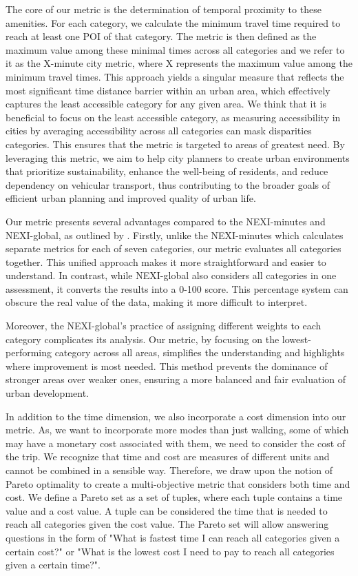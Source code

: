 The core of our metric is the determination of temporal proximity to these amenities. 
For each category, we calculate the minimum travel time required to reach at least one POI of that category. 
The metric is then defined as the maximum value among these minimal times across all categories and we refer to it as the X-minute city metric, where X represents the maximum value among the minimum travel times.
This approach yields a singular measure that reflects the most significant time distance barrier within an urban area, which effectively captures the least accessible category for any given area.
We think that it is beneficial to focus on the least accessible category, as measuring accessibility in cities by averaging accessibility across all categories can mask disparities categories. 
This ensures that the metric is targeted to areas of greatest need. 
By leveraging this metric, we aim to help city planners to create urban environments that prioritize sustainability, enhance the well-being of residents, and reduce dependency on vehicular transport, thus contributing to the broader goals of efficient urban planning and improved quality of urban life.

Our metric presents several advantages compared to the NEXI-minutes and NEXI-global, as outlined by .
Firstly, unlike the NEXI-minutes which calculates separate metrics for each of seven categories, our metric evaluates all categories together. 
This unified approach makes it more straightforward and easier to understand. 
In contrast, while NEXI-global also considers all categories in one assessment, it converts the results into a 0-100 score. 
This percentage system can obscure the real value of the data, making it more difficult to interpret.

Moreover, the NEXI-global's practice of assigning different weights to each category complicates its analysis. 
Our metric, by focusing on the lowest-performing category across all areas, simplifies the understanding and highlights where improvement is most needed. 
This method prevents the dominance of stronger areas over weaker ones, ensuring a more balanced and fair evaluation of urban development. 

In addition to the time dimension, we also incorporate a cost dimension into our metric.
As, we want to incorporate more modes than just walking, some of which may have a monetary cost associated with them, we need to consider the cost of the trip.
We recognize that time and cost are measures of different units and cannot be combined in a sensible way.
Therefore, we draw upon the notion of Pareto optimality to create a multi-objective metric that considers both time and cost.
We define a Pareto set as a set of tuples, where each tuple contains a time value and a cost value.
A tuple can be considered the time that is needed to reach all categories given the cost value.
The Pareto set will allow answering questions in the form of "What is fastest time I can reach all categories given a certain cost?" or "What is the lowest cost I need to pay to reach all categories given a certain time?".

